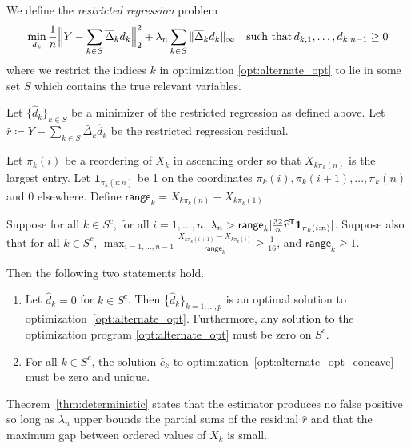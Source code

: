 \begin{definition}
\label{def:restricted_regression}
We define the \emph{restricted regression} problem 
\[
\min_{d_k} \frac{1}{n} \Big\| Y - \sum_{k \in S} \overline{\Delta}_k d_k \Big\|_2^2 + 
   \lambda_n \sum_{k \in S} \| \overline{\Delta}_k d_k \|_\infty \quad \textrm{such that} \, d_{k,1}, \ldots, d_{k,n-1} \geq 0
\]
where we restrict the indices $k$ in
optimization \eqref{opt:alternate_opt} to lie in some set $S$ which contains the true
relevant variables.
\end{definition}



\begin{theorem}
\label{thm:deterministic}
Let $\{\hat{d}_k \}_{k \in S}$ be a minimizer of the restricted regression as defined above.
Let $\hat{r} \coloneqq Y - \sum_{k \in S} \bar{\Delta}_k \hat{d}_k$ be the restricted regression residual. 

Let $\pi_k(i)$ be a reordering of $X_k$ in ascending order so that $X_{k \pi_k(n)}$ is the largest entry. Let $\mathbf{1}_{\pi_k(i:n)}$ be 1 on the coordinates $\pi_k(i),\pi_k(i+1),...,\pi_k(n)$ and 0 elsewhere. Define $\mathsf{range}_k = X_{k\pi_k(n)} - X_{k\pi_k(1)}$.

Suppose for all $k\in S^c$, for all $i=1,\ldots,n$, $\lambda_n > \mathsf{range}_k| \frac{32}{n} \widehat{r}^{\mathsf{T}} \mbox{\boldmath $1$}_{\pi_k(i:n)}|$. Suppose also that for all $k \in S^c$, $\max_{i=1,...,n-1} \frac{X_{k\pi_k(i+1)} - X_{k\pi_k(i)}}{\mathsf{range}_k} \geq \frac{1}{16}$, and $\mathsf{range}_k \geq 1$.

Then the following two statements hold.
\begin{enumerate}
\item Let $\hat{d}_k = 0$ for $k \in S^c$.  Then
  \{$\hat{d}_k\}_{k=1,\ldots,p}$ is an optimal solution to
  optimization~\eqref{opt:alternate_opt}. Furthermore, any solution to
  the optimization program \eqref{opt:alternate_opt} must be zero on
  $S^c$.
\item For all $k \in S^c$, the solution $\hat{c}_k$ to optimization~\eqref{opt:alternate_opt_concave} must be zero and unique.
\end{enumerate}

\end{theorem}

Theorem~\ref{thm:deterministic} states that the estimator produces no false positive so long as $\lambda_n$ upper bounds the partial sums of the residual $\hat{r}$ and that the maximum gap between ordered values of $X_k$ is small. 

